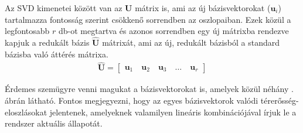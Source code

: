            Az SVD kimenetei között van az $\textbf{U}$ mátrix is, ami az új bázisvektorokat ($\textbf{u}_i$) tartalmazza fontosság szerint csökkenő sorrendben az oszlopaiban. Ezek közül a legfontosabb $r$ db-ot megtartva és azonos sorrendben egy új mátrixba rendezve kapjuk a redukált bázis $\mathbf{\hat{U}}$ mátrixát, ami az új, redukált bázisból a standard bázisba való áttérés mátrixa.
            \begin{equation}\label{equ:uhat}
                \begin{aligned}
                    \mathbf{\hat{U}} =
                    \begin{bmatrix}
                        \textbf{u}_1\quad\textbf{u}_2\quad\textbf{u}_3\quad\hdots\quad\textbf{u}_r
                    \end{bmatrix}
                \end{aligned}
            \end{equation}
            \par
            Érdemes szemügyre venni magukat a bázisvektorokat is, amelyek közül néhány . ábrán látható. Fontos megjegyezni, hogy az egyes bázisvektorok valódi térerősség-eloszlásokat jelentenek, amelyeknek valamilyen lineáris kombinációjával írjuk le a rendszer aktuális állapotát.
